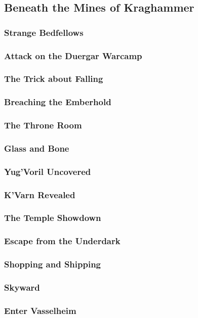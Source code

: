\newpage
\subsection{{Beneath the Mines of Kraghammer}} \vspace*{\fill}
\newpage
    
    
    \subsubsection{Strange Bedfellows}
    \subsubsection{Attack on the Duergar Warcamp}
    \subsubsection{The Trick about Falling}
    \subsubsection{Breaching the Emberhold}
    \subsubsection{The Throne Room}
    \subsubsection{Glass and Bone}
    \subsubsection{Yug'Voril Uncovered}
    \subsubsection{K'Varn Revealed}
    \subsubsection{The Temple Showdown}
    \subsubsection{Escape from the Underdark}
    \subsubsection{Shopping and Shipping}
    \subsubsection{Skyward}
    \subsubsection{Enter Vasselheim}